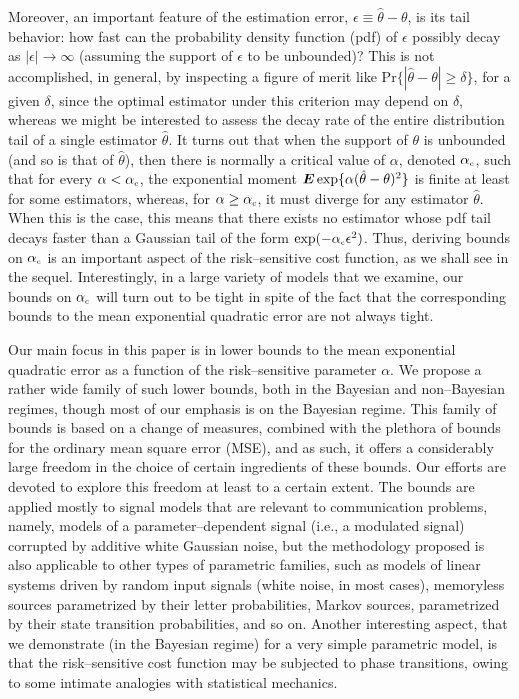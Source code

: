 \documentclass[11pt,epsf]{article}
\newcommand{\ct}{\hat{\theta}}
\newcommand {\bE} {\mbox{\boldmath $E$}}
\begin{document}
Moreover, an important feature of the estimation error, $\epsilon\equiv\ct-\theta$,
is its tail behavior: how fast can the probability density function (pdf) 
of $\epsilon$ possibly decay as
$|\epsilon|\to\infty$ (assuming the support of $\epsilon$ to be unbounded)?
This is not accomplished, in general, by inspecting a figure of merit like
$\mbox{Pr}\{|\ct-\theta| \ge \delta\}$, for a given $\delta$, 
since the optimal estimator under this
criterion may depend on $\delta$, whereas we might be interested to 
assess the decay rate of the entire distribution tail of a single estimator $\ct$.
It turns out that when the support of $\theta$ is unbounded (and so is
that of $\ct$), then there is normally a critical value of $\alpha$, denoted
$\alpha_{\mbox{\tiny c}}$, such that for every $\alpha < \alpha_{\mbox{\tiny
c}}$, the exponential moment $\bE\exp\{\alpha(\ct-\theta)^2\}$ is finite at
least for some estimators,
whereas, for 
$\alpha\ge \alpha_{\mbox{\tiny
c}}$, it must diverge
for any estimator $\ct$. When this is the case, 
this means that there exists no estimator whose pdf
tail decays faster than a Gaussian tail of the form $\exp(-\alpha_{\mbox{\tiny
c}}\epsilon^2)$. Thus, deriving bounds on $\alpha_{\mbox{\tiny c}}$ is an
important aspect of the risk--sensitive cost function, as we shall see in the
sequel. Interestingly, in a large variety of models that we examine, our
bounds on $\alpha_{\mbox{\tiny c}}$ will turn out to be tight in spite of the
fact that the corresponding bounds to the mean exponential quadratic error
are not always tight.

Our main focus in this paper is in lower bounds to the mean exponential
quadratic error as a function of the risk--sensitive parameter $\alpha$.
We propose a rather wide family of such lower bounds, both
in the Bayesian and non--Bayesian regimes, though most of our emphasis is on
the Bayesian regime. This family of bounds is
based on a change
of measures, combined with the plethora of bounds for the ordinary 
mean square error (MSE), and as such, it offers a considerably large 
freedom in the choice of certain ingredients of these bounds. 
Our efforts are devoted to explore this freedom at least to a certain extent.
The bounds are applied mostly to signal
models that are relevant to communication problems, namely,
models of a parameter--dependent signal
(i.e., a modulated signal) corrupted by additive white Gaussian noise, but
the methodology proposed is also applicable to other types of parametric
families, such as models of linear systems driven by random input signals (white noise,
in most cases), memoryless sources parametrized by their letter
probabilities, Markov sources, parametrized by their state transition probabilities, and so on.
Another interesting aspect, that we demonstrate
(in the Bayesian regime) for 
a very simple parametric model, is that the risk--sensitive
cost function may be subjected to phase transitions,
owing to some intimate analogies with statistical mechanics.
\end{document}
